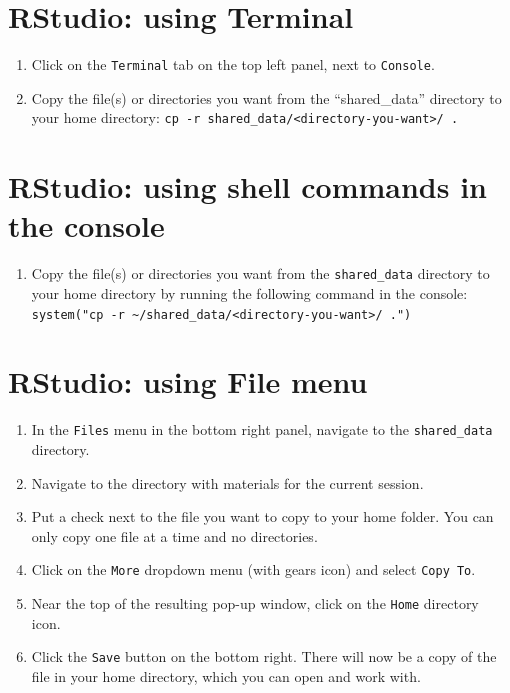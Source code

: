 \documentclass[]{book}
\providecommand{\tightlist}{%
  \setlength{\itemsep}{0pt}\setlength{\parskip}{0pt}}
\begin{document}
\hypertarget{rstudio-using-terminal}{%
\section{RStudio: using Terminal}\label{rstudio-using-terminal}}

\begin{enumerate}
\def\labelenumi{\arabic{enumi}.}
\tightlist
\item
  Click on the \texttt{Terminal} tab on the top left panel, next to \texttt{Console}.
\item
  Copy the file(s) or directories you want from the ``shared\_data'' directory to your home directory: \texttt{cp\ -r\ shared\_data/\textless{}directory-you-want\textgreater{}/\ .}
\end{enumerate}

\hypertarget{rstudio-using-shell-commands-in-the-console}{%
\section{RStudio: using shell commands in the console}\label{rstudio-using-shell-commands-in-the-console}}

\begin{enumerate}
\def\labelenumi{\arabic{enumi}.}
\tightlist
\item
  Copy the file(s) or directories you want from the \texttt{shared\_data} directory to your home directory by running the following command in the console: \texttt{system("cp\ -r\ \textasciitilde{}/shared\_data/\textless{}directory-you-want\textgreater{}/\ .")}
\end{enumerate}

\hypertarget{rstudio-using-file-menu}{%
\section{RStudio: using File menu}\label{rstudio-using-file-menu}}

\begin{enumerate}
\def\labelenumi{\arabic{enumi}.}
\tightlist
\item
  In the \texttt{Files} menu in the bottom right panel, navigate to the \texttt{shared\_data} directory.
\item
  Navigate to the directory with materials for the current session.
\item
  Put a check next to the file you want to copy to your home folder. You can only copy one file at a time and no directories.
\item
  Click on the \texttt{More} dropdown menu (with gears icon) and select \texttt{Copy\ To}.
\item
  Near the top of the resulting pop-up window, click on the \texttt{Home} directory icon.
\item
  Click the \texttt{Save} button on the bottom right. There will now be a copy of the file in your home directory, which you can open and work with.
\end{enumerate}
\end{document}
